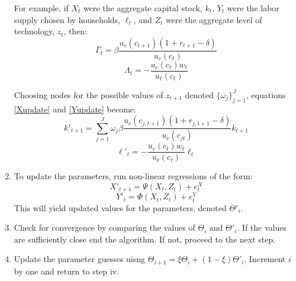 \documentclass[letterpaper,12pt]{article}
\begin{document}
\begin{spacing}{1.5}
\begin{enumerate}
For example, if $X_t$ were the aggregate capital stock, $k_t$, $Y_t$ were the labor supply chosen by households, $\ell_t$, and $Z_t$ were the aggregate level of technology, $z_t$, then:
\begin{equation}\label{GammaEx}
	\Gamma_t =\beta \frac{u_c(c_{t+1})(1+r_{t+1}-\delta)}{u_c(c_t)} 
\end{equation}
\begin{equation}\label{LambdaEx}
	\Lambda_t =-\frac{u_c(c_{t})w_t}{u_{\ell}(c_t)} 
\end{equation}

Choosing nodes for the possible values of $z_{t+1}$ denoted $\{\omega_j\}_{j=1}^J$, equations \eqref{Xupdate} and \eqref{Yupdate} become:
\begin{equation}\label{XupdateEx}
	k'_{t+1} = \sum_{j=1}^J \omega_j \beta \frac{u_c(c_{j,t+1})(1+r_{j,t+1}-\delta)}{u_c(c_{jt})} k_{t+1}
\end{equation}
\begin{equation}\label{YupdateEx}
	\ell '_t =  -\frac{u_c(c_{t})w_{t}}{u_{\ell}(c_{t})} \ell_t
\end{equation}

\item To update the parameters, run non-linear regressions of the form:
\begin{equation}\label{XRegress}
	X'_{t+1} =  \Psi(X_{t},Z_{t}) + e^X_t
\end{equation}
\begin{equation}\label{YRegress}
	Y'_{t} =  \Phi(X_{t},Z_{t}) + e^Y_t
\end{equation}
This will yield updated values for the parameters, denoted $\Theta '_i$.

\item Check for convergence by comparing the values of $\Theta_i$ and $\Theta '_i$.  If the values are sufficiently close end the algorithm.  If not, proceed to the next step.

\item Update the parameter guesses uisng $\Theta _{i+1} = \xi \Theta_{i} + (1-\xi)\Theta '_{i}$.  Increment $i$ by one and return to step iv. 

\end{enumerate}
\end{spacing}

\newpage


\end{document}
